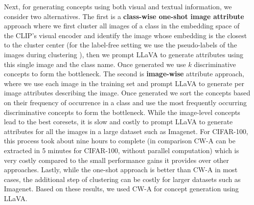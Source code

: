 Next, for generating concepts using both visual and textual information, we consider two alternatives.
The first is a {\bf class-wise one-shot image attribute} approach where we first cluster all images of a class in the embedding space of the CLIP's visual encoder and identify the image whose embedding is the closest to the cluster center (for the label-free setting we use the pseudo-labels of the images during clustering 
), then we prompt LLaVA to generate attributes using this single image and the class name. 
Once generated we use $k$ discriminative concepts to form the bottleneck.
The second is {\bf image-wise} attribute approach, where we use each image in the training set and prompt LLaVA to generate per image attributes describing the image. 
Once generated we sort the concepts based on their frequency of occurrence in a class and use the most frequently occurring discriminative concepts to form the bottleneck.
While the image-level concepts lead to the best coresets, it is slow and costly to prompt LLaVA to generate attributes for all the images in a large dataset such as Imagenet. 
For CIFAR-100, this process took about nine hours to complete (in comparison CW-A can be extracted in 5 minutes for CIFAR-100, without parallel computation) 
which is very costly compared to the small performance gains it provides over other approaches. 
Lastly, while the one-shot approach is better than CW-A in most cases, the additional step of clustering can be costly for larger datasets such as Imagenet. 
Based on these results, we used CW-A for concept generation using LLaVA.

